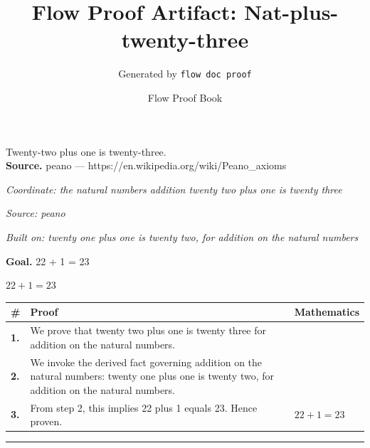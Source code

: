 \documentclass[11pt]{article}
\title{Flow Proof Artifact: Nat-plus-twenty-three}
\author{Generated by \texttt{flow doc proof}}
\date{Flow Proof Book}
\theoremstyle{definition}
\begin{document}
\maketitle
Twenty-two plus one is twenty-three.\\[0.5em]
\textbf{Source.} peano — https://en.wikipedia.org/wiki/Peano\_axioms\\[0.5em]
\bigskip
{}\par
\smallskip\noindent\textit{Coordinate: the natural numbers \cdot addition \cdot twenty two plus one is twenty three}\par
\smallskip\noindent\textit{Source: peano}\par
\smallskip\noindent\textit{Built on: twenty one plus one is twenty two, for addition on the natural numbers}\par
\medskip
\noindent\textbf{Goal.} 22 + 1 = 23\par
\noindent$\displaystyle 22 + 1 = 23$\par
\medskip
\noindent
\begin{tabular}{@{} >{\raggedright\arraybackslash}p{} >{\raggedright\arraybackslash}p{} >{\raggedleft\arraybackslash}p{} @{}}
\textbf{\#} & \textbf{Proof} & \textbf{Mathematics} \\
\midrule
\textbf{1.} & We prove that twenty two plus one is twenty three for addition on the natural numbers. & \\[0.45em]
\textbf{2.} & We invoke the derived fact governing addition on the natural numbers: twenty one plus one is twenty two, for addition on the natural numbers. & \\[0.45em]
\textbf{3.} & From step 2, this implies 22 plus 1 equals 23. Hence proven. & $\displaystyle 22 + 1 = 23$ \\[0.45em]
\bottomrule
\end{tabular}
\label{thm:Nat-addition-twenty_two_plus_one_is_twenty_three}
\par\medskip\hrule
\end{document}
